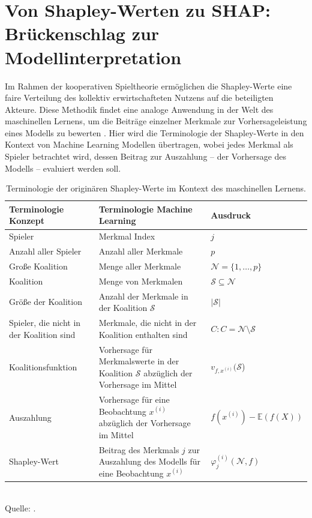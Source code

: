 \chapter{Von Shapley-Werten zu SHAP: Brückenschlag zur Modellinterpretation}

Im Rahmen der kooperativen Spieltheorie ermöglichen die Shapley-Werte eine faire Verteilung des kollektiv 
erwirtschafteten Nutzens auf die beteiligten Akteure. Diese Methodik findet eine analoge Anwendung 
in der Welt des maschinellen Lernens, um die Beiträge einzelner Merkmale zur Vorhersageleistung 
eines Modells zu bewerten \cite[S. 26]{Molnar_2023}. Hier wird die Terminologie der Shapley-Werte in den Kontext von Machine Learning 
Modellen übertragen, wobei jedes Merkmal als \glqq{}Spieler\grqq{} betrachtet wird, dessen Beitrag zur 
\glqq{}Auszahlung\grqq{} – der Vorhersage des Modells – evaluiert werden soll. 

\begin{table}[!h]
    \caption{Terminologie der originären Shapley-Werte im Kontext des maschinellen Lernens.}
    \footnotesize
    \begin{tabularx}{\textwidth}{XXX}
    \toprule
    Terminologie Konzept & Terminologie Machine Learning & Ausdruck \\
    \midrule
    Spieler & Merkmal Index & $j$ \\
    Anzahl aller Spieler & Anzahl aller Merkmale & $p$ \\
    Große Koalition & Menge aller Merkmale & $\mathcal{N} = \{1, \ldots, p\}$\\
    Koalition & Menge von Merkmalen & $\mathcal{S} \subseteq \mathcal{N}$ \\
    Größe der Koalition & Anzahl der Merkmale in der Koalition $\mathcal{S}$ & $|\mathcal{S}|$\\
    Spieler, die nicht in der Koalition sind & Merkmale, die nicht in der Koalition enthalten sind & $C: C = \mathcal{N} \setminus \mathcal{S}$ \\
    Koalitionsfunktion & Vorhersage für Merkmalswerte in der Koalition $\mathcal{S}$ abzüglich der Vorhersage im Mittel & $v_{f, x^{(i)}}(\mathcal{S}$)\\
    Auszahlung & Vorhersage für eine Beobachtung $x^{(i)}$ abzüglich der Vorhersage im Mittel & $f(x^{(i)}) -  \mathbb{E}(f(X))$\\
    Shapley-Wert & Beitrag des Merkmals $j$ zur Auszahlung des Modells für eine Beobachtung $x^{(i)}$& $\varphi_j^{(i)}(\mathcal{N}, f)$\\
    \bottomrule
    \end{tabularx}
    \label{tab:shapley_terms}
    \normalsize\\
    Quelle: \cite[S. 26]{Molnar_2023}.
\end{table}

